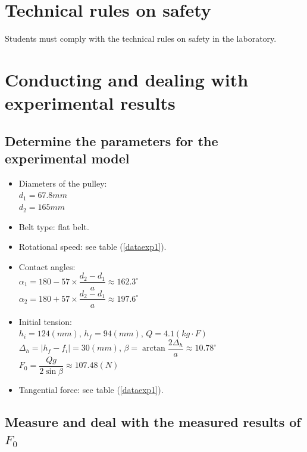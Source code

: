 \section{Technical rules on safety}
Students must comply with the technical rules on safety in the laboratory.

\section{Conducting and dealing with experimental results}
\subsection{Determine the parameters for the experimental model}
	\begin{itemize}
		\item Diameters of the pulley:\\
		$ d_1 = 67.8\unit{mm} $\\
		$ d_2 = 165\unit{mm} $
		\item Belt type: flat belt.
		\item Rotational speed: see table (\ref{dataexp1}).
		\item Contact angles:\\
			$ \alpha_1 = 180 - 57\times\dfrac{d_2-d_1}{a} \approx 162.3^{\circ}$\\
			 $ \alpha_2 = 180 + 57\times\dfrac{d_2-d_1}{a} \approx 197.6^{\circ}$
		\item Initial tension:\\
			$ h_i = 124\unit{(mm)}$, $ h_f = 94\unit{(mm)} $, $ Q = 4.1\unit{(kg\cdot F)} $\\
			$ \Delta_h=|h_f-f_i|=30\unit{(mm)} $, $ \beta=\arctan\dfrac{2\Delta_h}{a} \approx 10.78^{\circ}$\\
			$ F_0 = \dfrac{Qg}{2\sin\beta} \approx 107.48\unit{(N)}$

		\item Tangential force: see table (\ref{dataexp1}).
	\end{itemize}
\subsection{Measure and deal with the measured results of $ F_0 $}
